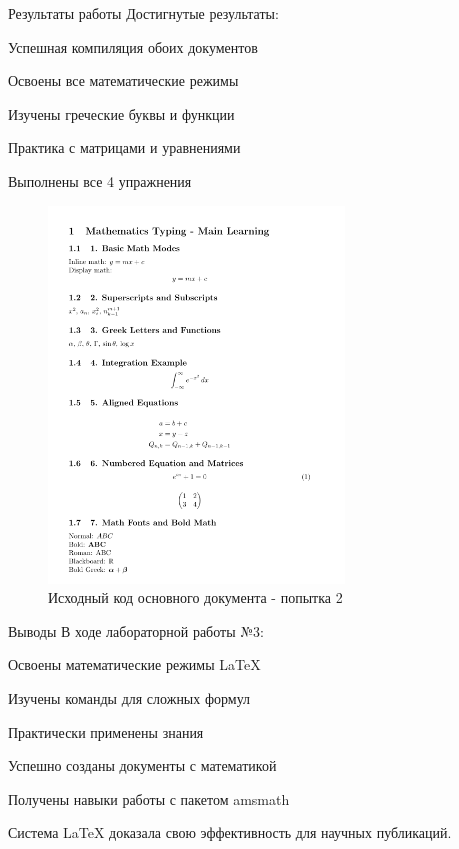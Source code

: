 \begin{frame}{Результаты работы}
\label{ux440ux435ux437ux443ux43bux44cux442ux430ux442ux44b-ux440ux430ux431ux43eux442ux44b}
Достигнутые результаты:

Успешная компиляция обоих документов

Освоены все математические режимы

Изучены греческие буквы и функции

Практика с матрицами и уравнениями

Выполнены все 4 упражнения

\begin{figure}
\centering
\includegraphics[width=0.7\textwidth,height=\textheight]{image_04.jpg}
\caption{Исходный код основного документа - попытка 2}
\end{figure}
\end{frame}

\begin{frame}{Выводы}
\label{ux432ux44bux432ux43eux434ux44b}
В ходе лабораторной работы №3:

Освоены математические режимы LaTeX

Изучены команды для сложных формул

Практически применены знания

Успешно созданы документы с математикой

Получены навыки работы с пакетом amsmath

Система LaTeX доказала свою эффективность для научных публикаций.
\end{frame}
